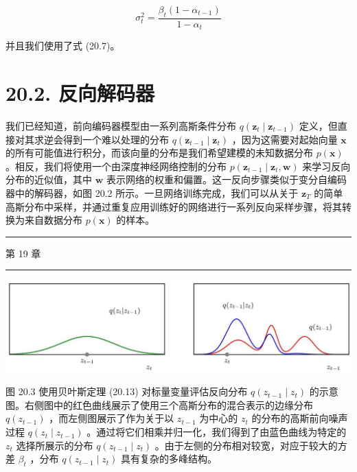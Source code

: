 \documentclass[10pt]{article}
\newcommand{\HRule}{\begin{center}\rule{0.9\linewidth}{0.2mm}\end{center}}
\begin{document}
\[
{\sigma }_{t}^{2} = \frac{{\beta }_{t}\left( {1 - {\alpha }_{t - 1}}\right) }{1 - {\alpha }_{t}} \tag{20.17}
\]

并且我们使用了式 (20.7)。

\section*{20.2. 反向解码器}

我们已经知道，前向编码器模型由一系列高斯条件分布 \(q\left( {{\mathbf{z}}_{t} \mid  {\mathbf{z}}_{t - 1}}\right)\) 定义，但直接对其求逆会得到一个难以处理的分布 \(q\left( {{\mathbf{z}}_{t - 1} \mid  {\mathbf{z}}_{t}}\right)\) ，因为这需要对起始向量 \(\mathbf{x}\) 的所有可能值进行积分，而该向量的分布是我们希望建模的未知数据分布 \(p\left( \mathbf{x}\right)\) 。相反，我们将使用一个由深度神经网络控制的分布 \(p\left( {{\mathbf{z}}_{t - 1} \mid  {\mathbf{z}}_{t},\mathbf{w}}\right)\) 来学习反向分布的近似值，其中 \(\mathbf{w}\) 表示网络的权重和偏置。这一反向步骤类似于变分自编码器中的解码器，如图 20.2 所示。一旦网络训练完成，我们可以从关于 \({\mathbf{z}}_{T}\) 的简单高斯分布中采样，并通过重复应用训练好的网络进行一系列反向采样步骤，将其转换为来自数据分布 \(p\left( \mathbf{x}\right)\) 的样本。

\HRule

第 19 章

\HRule

\begin{center}
\includegraphics[max width=1.0\textwidth]{images/0194e279-9b28-703a-88f4-c3ac21e2010d_605_243_345_1305_349_0.jpg}
\end{center}
\hspace*{3em} 

图 20.3 使用贝叶斯定理 (20.13) 对标量变量评估反向分布 \(q\left( {{z}_{t - 1} \mid  {z}_{t}}\right)\) 的示意图。右侧图中的红色曲线展示了使用三个高斯分布的混合表示的边缘分布 \(q\left( {z}_{t - 1}\right)\) ，而左侧图展示了作为关于以 \({z}_{t - 1}\) 为中心的 \({z}_{t}\) 的分布的高斯前向噪声过程 \(q\left( {{z}_{t} \mid  {z}_{t - 1}}\right)\) 。通过将它们相乘并归一化，我们得到了由蓝色曲线为特定的 \({z}_{t}\) 选择所展示的分布 \(q\left( {{z}_{t - 1} \mid  {z}_{t}}\right)\) 。由于左侧的分布相对较宽，对应于较大的方差 \({\beta }_{t}\) ，分布 \(q\left( {{z}_{t - 1} \mid  {z}_{t}}\right)\) 具有复杂的多峰结构。
\end{document}
